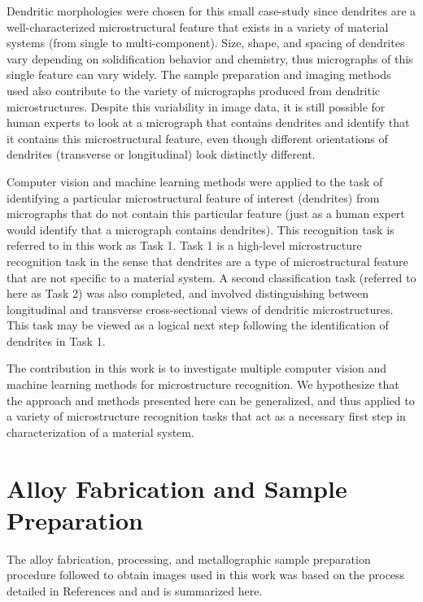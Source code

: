 Dendritic morphologies were chosen for this small case-study since dendrites are a well-characterized microstructural feature that exists in a variety of material systems (from single to multi-component).  Size, shape, and spacing of dendrites vary depending on solidification behavior and chemistry, thus micrographs of this single feature can vary widely.  The sample preparation and imaging methods used also contribute to the variety of micrographs produced from dendritic microstructures. Despite this variability in image data, it is still possible for human experts to look at a micrograph that contains dendrites and identify that it contains this microstructural feature, even though different orientations of dendrites (transverse or longitudinal) look distinctly different.  

Computer vision and machine learning methods were applied to the task of identifying a particular microstructural feature of interest (dendrites) from micrographs that do not contain this particular feature (just as a human expert would identify that a micrograph contains dendrites).  This recognition task is referred to in this work as Task 1.  Task 1 is a high-level microstructure recognition task in the sense that dendrites are a type of microstructural feature that are not specific to a material system.  A second classification task (referred to here as Task 2) was also completed, and involved distinguishing between longitudinal and transverse cross-sectional views of dendritic microstructures. This task may be viewed as a logical next step following the identification of dendrites in Task 1.

The contribution in this work is to investigate multiple computer vision and machine learning methods for microstructure recognition. We hypothesize that the approach and methods presented here can be generalized, and thus applied to a variety of microstructure recognition tasks that act as a necessary first step in characterization of a material system.

\section{Alloy Fabrication and Sample Preparation}
\label{sample_prep}

The alloy fabrication, processing, and metallographic sample preparation procedure followed to obtain images used in this work was based on the process detailed in References \cite{Schaefer2005} and \cite{Mao2014} and is summarized here. 
%

